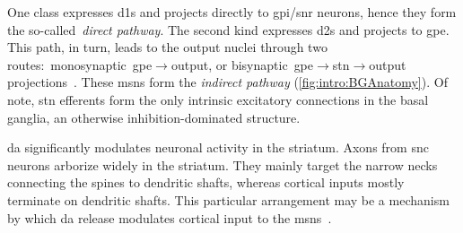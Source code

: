 One class expresses \glspl{d1} and projects directly to \gls{gpi}/\gls{snr} neurons, hence they form the so-called~\emph{direct pathway}.
The second kind expresses \glspl{d2} and projects to \gls{gpe}.
This path, in turn, leads to the output nuclei through two routes:~monosynaptic~\gls{gpe}$\rightarrow$output, or bisynaptic~\gls{gpe}$\rightarrow$\gls{stn}$\rightarrow$output projections~\cite{TURNER2000BasalFunction}.
These \glspl{msn} form the \emph{indirect pathway} (\autoref{fig:intro:BGAnatomy}).
Of note, \gls{stn} efferents form the only intrinsic excitatory connections in the basal ganglia, an otherwise inhibition-dominated structure.
\par
\Gls{da} significantly modulates neuronal activity in the striatum.
Axons from \gls{snc} neurons arborize widely in the striatum.
They mainly target the narrow necks connecting the spines to dendritic shafts, whereas cortical inputs mostly terminate on dendritic shafts.
This particular arrangement may be a mechanism by which \gls{da} release modulates cortical input to the \glspl{msn}~\cite{TURNER2000BasalFunction}.